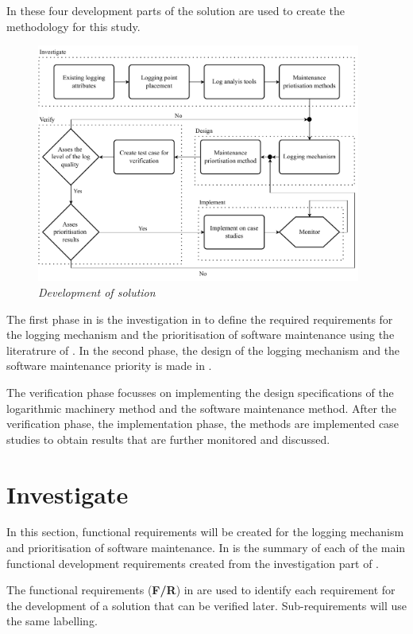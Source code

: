 In  these four development parts of the solution are used to create the methodology for this study.

\begin{figure}[!htb]
	\centering %
	\includegraphics[width=0.95\textwidth]{img/Chapter2/developmentOfSolution/developementOfSolution.pdf}
	\caption[Development of solution]
	{\textit{Development of solution}}\label{fig:ch2_developmentOfSolution}
\end{figure}

The first phase in  is the investigation in  to define the required requirements for the logging mechanism and the prioritisation of software maintenance using the literatrure of . In the second phase, the design of the logging mechanism and the software maintenance priority is made in . \par The verification phase focusses on implementing the design specifications of the logarithmic machinery method and the software maintenance method. After the verification phase, the implementation phase, the methods are implemented case studies to obtain results that are further monitored and discussed.
 
\clearpage

\section{Investigate}\label{sec:ch2_investigate}
In this section, functional requirements will be created for the logging mechanism and prioritisation of software maintenance. In  is the summary of each of the main functional development requirements created from the investigation part of .\par The functional requirements (\textbf{F/R}) in  are used to identify each requirement for the development of a solution that can be verified later. Sub-requirements will use the same labelling. 


